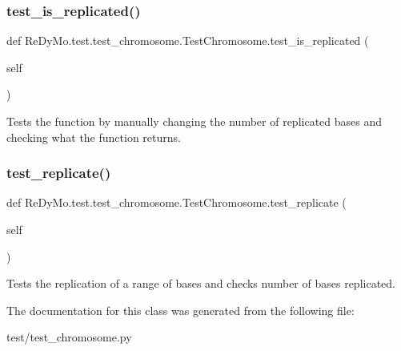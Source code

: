 \subsubsection{\texorpdfstring{test\+\_\+is\+\_\+replicated()}{test\_is\_replicated()}}
{\footnotesize\ttfamily def Re\+Dy\+Mo.\+test.\+test\+\_\+chromosome.\+Test\+Chromosome.\+test\+\_\+is\+\_\+replicated (\begin{DoxyParamCaption}\item[{}]{self }\end{DoxyParamCaption})}



Tests the function by manually changing the number of replicated bases and checking what the function returns. 

\mbox{\label{classReDyMo_1_1test_1_1test__chromosome_1_1TestChromosome_a22ef06b4ce026761f08ffb7bfca2809a}} 
\subsubsection{\texorpdfstring{test\+\_\+replicate()}{test\_replicate()}}
{\footnotesize\ttfamily def Re\+Dy\+Mo.\+test.\+test\+\_\+chromosome.\+Test\+Chromosome.\+test\+\_\+replicate (\begin{DoxyParamCaption}\item[{}]{self }\end{DoxyParamCaption})}



Tests the replication of a range of bases and checks number of bases replicated. 



The documentation for this class was generated from the following file\+:\begin{DoxyCompactItemize}
\item 
test/test\+\_\+chromosome.\+py\end{DoxyCompactItemize}
